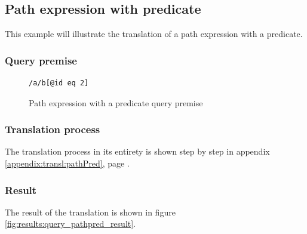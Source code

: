 \subsection{Path expression with predicate}
This example will illustrate the translation of a path expression with a predicate.

\subsubsection{Query premise}
\begin{figure}[!htp]
\begin{center}
\begin{Verbatim}
/a/b[@id eq 2] 
\end{Verbatim}
  \caption{Path expression with a predicate query premise}
  \label{fig:results:query_pathPred}
\end{center}
\end{figure}

\subsubsection{Translation process}
The translation process in its entirety is shown step by step in appendix
\ref{appendix:transl:pathPred}, page \pageref{appendix:transl:pathPred}.

\subsubsection{Result}
The result of the translation is shown in figure
\ref{fig:results:query_pathpred_result}.


